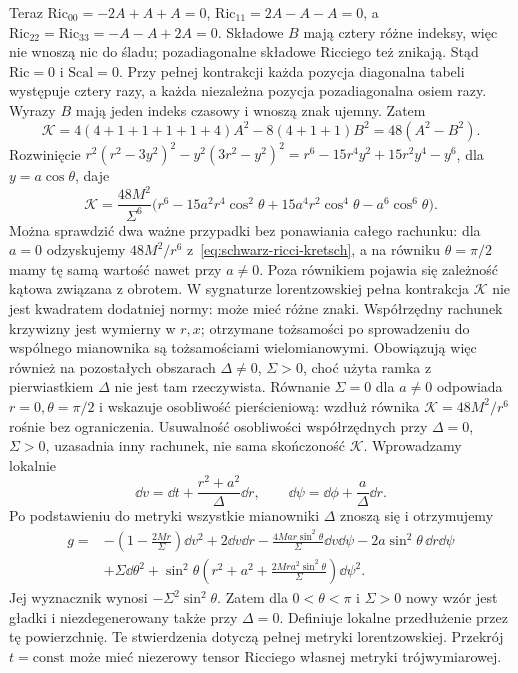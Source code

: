 \begin{przyklad}
Teraz $\mathrm{Ric}_{00}=-2A+A+A=0$,
$\mathrm{Ric}_{11}=2A-A-A=0$, a
$\mathrm{Ric}_{22}=\mathrm{Ric}_{33}=-A-A+2A=0$.
Składowe $B$ mają cztery różne indeksy, więc nie wnoszą
nic do śladu; pozadiagonalne składowe Ricciego też znikają.
Stąd $\mathrm{Ric}=0$ i $\mathrm{Scal}=0$.
Przy pełnej kontrakcji każda pozycja diagonalna tabeli
występuje cztery razy, a każda niezależna pozycja
pozadiagonalna osiem razy. Wyrazy $B$ mają jeden indeks
czasowy i wnoszą znak ujemny. Zatem
\[
 \mathcal K=4(4+1+1+1+1+4)A^2-8(4+1+1)B^2
           =48(A^2-B^2).
\]
Rozwinięcie
$r^2(r^2-3y^2)^2-y^2(3r^2-y^2)^2
=r^6-15r^4y^2+15r^2y^4-y^6$, dla $y=a\cos\theta$,
daje
\begin{equation}\label{eq:kerr-kretschmann}
 \mathcal K
 =\frac{48M^2}{\Sigma^6}
 \bigl(r^6-15a^2r^4\cos^2\theta
       +15a^4r^2\cos^4\theta-a^6\cos^6\theta\bigr).
\end{equation}
Można sprawdzić dwa ważne przypadki bez ponawiania
całego rachunku: dla $a=0$ odzyskujemy
$48M^2/r^6$ z~\eqref{eq:schwarz-ricci-kretsch},
a na równiku $\theta=\pi/2$ mamy tę samą wartość
nawet przy $a\ne0$. Poza równikiem pojawia się
zależność kątowa związana z obrotem. W sygnaturze
lorentzowskiej pełna kontrakcja $\mathcal K$ nie jest
kwadratem dodatniej normy: może mieć różne znaki.
Współrzędny rachunek krzywizny jest wymierny w $r,x$;
otrzymane tożsamości po sprowadzeniu do wspólnego mianownika
są tożsamościami wielomianowymi. Obowiązują więc również
na pozostałych obszarach $\Delta\ne0$, $\Sigma>0$,
choć użyta ramka z pierwiastkiem $\Delta$ nie jest tam rzeczywista.
Równanie $\Sigma=0$ dla $a\ne0$ odpowiada
$r=0,\theta=\pi/2$ i wskazuje osobliwość
pierścieniową: wzdłuż równika $\mathcal K=48M^2/r^6$
rośnie bez ograniczenia. Usuwalność osobliwości współrzędnych
przy $\Delta=0$, $\Sigma>0$, uzasadnia inny rachunek,
nie sama skończoność $\mathcal K$. Wprowadzamy lokalnie
\[
 \dd v=\dd t+\frac{r^2+a^2}{\Delta}\dd r,
 \qquad \dd\psi=\dd\phi+\frac a\Delta\dd r.
\]
Po podstawieniu do metryki wszystkie mianowniki $\Delta$
znoszą się i otrzymujemy
\[
 \begin{split}
 g={}&-\left(1-\frac{2Mr}{\Sigma}\right)\dd v^2
       +2\dd v\dd r-\frac{4Mar\sin^2\theta}{\Sigma}\dd v\dd\psi
       -2a\sin^2\theta\,\dd r\dd\psi\\
    &+\Sigma\dd\theta^2
       +\sin^2\theta\left(r^2+a^2+
                 \frac{2Mra^2\sin^2\theta}{\Sigma}\right)\dd\psi^2.
 \end{split}
\]
Jej wyznacznik wynosi $-\Sigma^2\sin^2\theta$.
Zatem dla $0<\theta<\pi$ i $\Sigma>0$ nowy wzór jest
gładki i niezdegenerowany także przy $\Delta=0$.
Definiuje lokalne przedłużenie przez tę powierzchnię.
Te stwierdzenia dotyczą pełnej
metryki lorentzowskiej. Przekrój $t=\mathrm{const}$
może mieć niezerowy tensor Ricciego własnej
metryki trójwymiarowej.
\end{przyklad}

